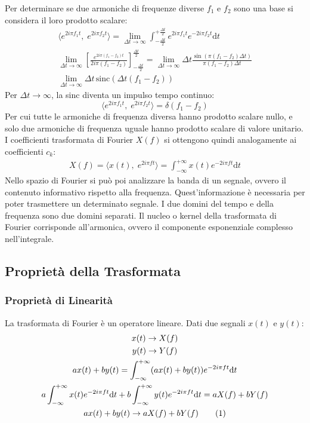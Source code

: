 \documentclass{article}
\newcommand{\sinc}{\mathrm{sinc}}
\newcommand{\df}{\mathrm{d}}
\newcommand{\tageq}{\tag{\stepcounter{equation}\theequation}}
\numberwithin{equation}{subsection}
\begin{document}
Per determinare se due armoniche di frequenze diverse $f_1$ e $f_2$ sono una base si considera il loro prodotto scalare:
\begin{gather*}
    \langle e^{2i\pi f_1t},\;e^{2i\pi f_2t}\rangle=\displaystyle\lim_{\Delta t\to\infty}\int_{-\frac{\Delta t}{2}}^{+\frac{\Delta t}{2}}e^{2i\pi f_1t}e^{-2i\pi f_2t}\df t\\
    \displaystyle\lim_{\Delta t\to\infty}\left[\frac{e^{2i\pi(f_1-f_2)t}}{2i\pi(f_1-f_2)}\right]^{\frac{\Delta t}{2}}_{-\frac{\Delta t}{2}}=\lim_{\Delta t\to\infty}
    \Delta t\frac{\sin(\pi(f_1-f_2)\Delta t)}{\pi(f_1-f_2)\Delta t}\\
    \displaystyle\lim_{\Delta t\to\infty}\Delta t\,\sinc(\Delta t(f_1-f_2))
\end{gather*}
Per $\Delta t\to\infty$, la sinc diventa un impulso tempo continuo:
\begin{equation*}
    \langle e^{2i\pi f_1t},\;e^{2i\pi f_2t}\rangle=\delta(f_1-f_2)
\end{equation*}
Per cui tutte le armoniche di frequenza diversa hanno prodotto scalare nullo, e solo due armoniche di frequenza uguale hanno prodotto scalare di valore unitario. 
I coefficienti trasformata di Fourier $X(f)$ si ottengono quindi analogamente ai coefficienti $c_k$:
\begin{gather*}
    X(f)=\langle x(t),\;e^{2i\pi ft}\rangle=\displaystyle\int_{-\infty}^{+\infty}x(t)e^{-2i\pi ft}\df t
\end{gather*}
Nello spazio di Fourier si può poi analizzare la banda di un segnale, ovvero il contenuto informativo rispetto alla frequenza. Quest'informazione è necessaria per poter 
trasmettere un determinato segnale. I due domini del tempo e della frequenza sono due domini separati. 
Il nucleo o kernel della trasformata di Fourier corrisponde all'armonica, ovvero il componente esponenziale complesso nell'integrale. 

\subsection{Proprietà della Trasformata}

\subsubsection{Proprietà di Linearità}

La trasformata di Fourier è un operatore lineare. Dati due segnali $x(t)$ e $y(t)$:
\begin{gather*}
    x(t)\to X(f)\\
    y(t)\to Y(f)\\
    ax(t)+by(t)=\displaystyle\int_{-\infty}^{+\infty}(ax(t)+by(t))e^{-2i\pi ft}\df t\\
    a\int_{-\infty}^{+\infty}x(t)e^{-2i\pi ft}\df t+b\int_{-\infty}^{+\infty}y(t)e^{-2i\pi ft}\df t= 
    aX(f)+bY(f)\\
    ax(t)+by(t)\to aX(f)+bY(f)\tageq
\end{gather*}
\end{document}
